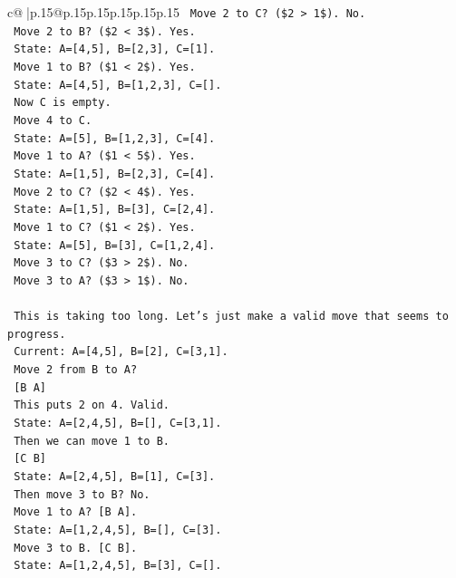 \documentclass{article}
\begin{document}
{\begin{supertabular}{c@{$\;$}|p{.15\linewidth}@{}p{.15\linewidth}p{.15\linewidth}p{.15\linewidth}p{.15\linewidth}p{.15\linewidth}}
{{{\texttt{   Move 2 to C? (\$2 > 1\$). No.} \\
\texttt{   Move 2 to B? (\$2 < 3\$). Yes.} \\
\texttt{   State: A={[}4,5{]}, B={[}2,3{]}, C={[}1{]}.} \\
\texttt{   Move 1 to B? (\$1 < 2\$). Yes.} \\
\texttt{   State: A={[}4,5{]}, B={[}1,2,3{]}, C={[}{]}.} \\
\texttt{   Now C is empty.} \\
\texttt{   Move 4 to C.} \\
\texttt{   State: A={[}5{]}, B={[}1,2,3{]}, C={[}4{]}.} \\
\texttt{   Move 1 to A? (\$1 < 5\$). Yes.} \\
\texttt{   State: A={[}1,5{]}, B={[}2,3{]}, C={[}4{]}.} \\
\texttt{   Move 2 to C? (\$2 < 4\$). Yes.} \\
\texttt{   State: A={[}1,5{]}, B={[}3{]}, C={[}2,4{]}.} \\
\texttt{   Move 1 to C? (\$1 < 2\$). Yes.} \\
\texttt{   State: A={[}5{]}, B={[}3{]}, C={[}1,2,4{]}.} \\
\texttt{   Move 3 to C? (\$3 > 2\$). No.} \\
\texttt{   Move 3 to A? (\$3 > 1\$). No.} \\
\\ 
\texttt{   This is taking too long. Let's just make a valid move that seems to progress.} \\
\texttt{   Current: A={[}4,5{]}, B={[}2{]}, C={[}3,1{]}.} \\
\texttt{   Move 2 from B to A?} \\
\texttt{   {[}B A{]}} \\
\texttt{   This puts 2 on 4. Valid.} \\
\texttt{   State: A={[}2,4,5{]}, B={[}{]}, C={[}3,1{]}.} \\
\texttt{   Then we can move 1 to B.} \\
\texttt{   {[}C B{]}} \\
\texttt{   State: A={[}2,4,5{]}, B={[}1{]}, C={[}3{]}.} \\
\texttt{   Then move 3 to B? No.} \\
\texttt{   Move 1 to A? {[}B A{]}.} \\
\texttt{   State: A={[}1,2,4,5{]}, B={[}{]}, C={[}3{]}.} \\
\texttt{   Move 3 to B. {[}C B{]}.} \\
\texttt{   State: A={[}1,2,4,5{]}, B={[}3{]}, C={[}{]}.} \\
}}}
\end{supertabular}}
\end{document}
